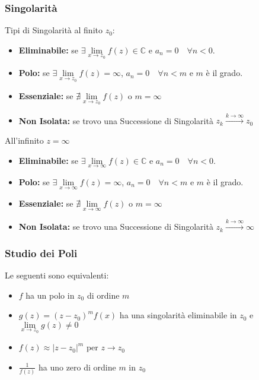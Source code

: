 \documentclass[a4paper,notitlepage]{report}%
\newcommand{\C}{\mathbb{C}}
\begin{document}
\begin{multicols*}{2}
\subsubsection*{Singolarità}
Tipi di Singolarità al finito $z_0$:
\begin{itemize}
    \item \textbf{Eliminabile:} se $\exists\lim\limits_{x\rightarrow z_0} f(z) \in \C$ e $a_n = 0 \quad \forall n<0$.
    \item \textbf{Polo:} se $\exists\lim\limits_{x\rightarrow z_0} f(z) = \infty$, $a_n = 0 \quad \forall n<m$ e $m$ è il grado.
    \item \textbf{Essenziale:} se $\nexists\lim\limits_{x\rightarrow z_0} f(z)$ o $m=\infty$
    \item \textbf{Non Isolata: } se trovo una Successione di Singolarità $z_k\xrightarrow{k\rightarrow\infty}z_0$
\end{itemize}
All'infinito $z=\infty$
\begin{itemize}
    \item \textbf{Eliminabile:} se $\exists\lim\limits_{x\rightarrow \infty} f(z) \in \C$ e $a_n = 0 \quad \forall n<0$.
    \item \textbf{Polo:} se $\exists\lim\limits_{x\rightarrow \infty} f(z) = \infty$, $a_n = 0 \quad \forall n<m$ e $m$ è il grado.
    \item \textbf{Essenziale:} se $\nexists\lim\limits_{x\rightarrow \infty} f(z)$ o $m=\infty$
    \item \textbf{Non Isolata: } se trovo una Successione di Singolarità $z_k\xrightarrow{k\rightarrow\infty}\infty$
\end{itemize}

\subsubsection*{Studio dei Poli}
Le seguenti sono equivalenti:
\begin{itemize}
    \item $f$ ha un polo in $z_0$ di ordine $m$
    \item $g(z)=(z-z_0)^mf(x)$ ha una singolarità eliminabile in $z_0$ e $\lim\limits_{x\rightarrow z_0} g(z)\neq 0$
    \item $f(z)\approx  |z-z_0 |^m$ per $z\rightarrow z_0$
    \item $\frac{1}{f(z)}$ ha uno zero di ordine $m$ in $z_0$
\end{itemize}


\end{multicols*}
\end{document}
